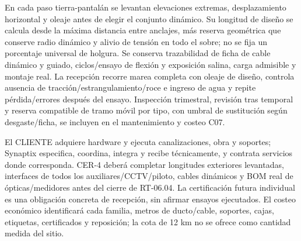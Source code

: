 En cada paso tierra-pantalán se levantan elevaciones extremas, desplazamiento horizontal y oleaje antes de elegir el conjunto dinámico. Su longitud de diseño se calcula desde la máxima distancia entre anclajes, más reserva geométrica que conserve radio dinámico y alivio de tensión en todo el sobre; no se fija un porcentaje universal de holgura. Se conserva trazabilidad de ficha de cable dinámico y guiado, ciclos/ensayo de flexión y exposición salina, carga admisible y montaje real. La recepción recorre marea completa con oleaje de diseño, controla ausencia de tracción/estrangulamiento/roce e ingreso de agua y repite pérdida/errores después del ensayo. Inspección trimestral, revisión tras temporal y reserva compatible de tramo móvil por tipo, con umbral de sustitución según desgaste/ficha, se incluyen en el mantenimiento y costeo C07.

El CLIENTE adquiere hardware y ejecuta canalizaciones, obra y soportes; Synaptix especifica, coordina, integra y recibe técnicamente, y contrata servicios donde corresponda. CER-4 deberá completar longitudes exteriores levantadas, interfaces de todos los auxiliares/CCTV/piloto, cables dinámicos y BOM real de ópticas/medidores antes del cierre de RT-06.04. La certificación futura individual es una obligación concreta de recepción, sin afirmar ensayos ejecutados. El costeo económico identificará cada familia, metros de ducto/cable, soportes, cajas, etiquetas, certificados y reposición; la cota de 12 km no se ofrece como cantidad medida del sitio.
